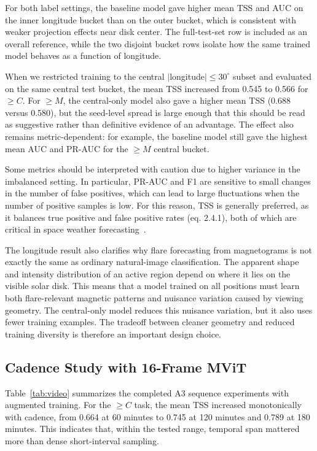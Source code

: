 For both label settings, the baseline model gave higher mean TSS and AUC on the inner longitude bucket than on the outer bucket, which is consistent with weaker projection effects near disk center. The full-test-set row is included as an overall reference, while the two disjoint bucket rows isolate how the same trained model behaves as a function of longitude.

When we restricted training to the central $|$longitude$| \leq 30^\circ$ subset and evaluated on the same central test bucket, the mean TSS increased from 0.545 to 0.566 for $\geq C$. For $\geq M$, the central-only model also gave a higher mean TSS (0.688 versus 0.580), but the seed-level spread is large enough that this should be read as suggestive rather than definitive evidence of an advantage. The effect also remains metric-dependent: for example, the baseline model still gave the highest mean AUC and PR-AUC for the $\geq M$ central bucket.

Some metrics should be interpreted with caution due to higher variance in the imbalanced setting. In particular, PR-AUC and F1 are sensitive to small changes in the number of false positives, which can lead to large fluctuations when the number of positive samples is low. For this reason, TSS is generally preferred, as it balances true positive and false positive rates (eq. 2.4.1), both of which are critical in space weather forecasting~\cite{ref_bloomfield}.

The longitude result also clarifies why flare forecasting from magnetograms is not exactly the same as ordinary natural-image classification. The apparent shape and intensity distribution of an active region depend on where it lies on the visible solar disk. This means that a model trained on all positions must learn both flare-relevant magnetic patterns and nuisance variation caused by viewing geometry. The central-only model reduces this nuisance variation, but it also uses fewer training examples. The tradeoff between cleaner geometry and reduced training diversity is therefore an important design choice.

\subsection{Cadence Study with 16-Frame MViT}

Table~\ref{tab:video} summarizes the completed A3 sequence experiments with augmented training. For the $\geq C$ task, the mean TSS increased monotonically with cadence, from 0.664 at 60 minutes to 0.745 at 120 minutes and 0.789 at 180 minutes. This indicates that, within the tested range, temporal span mattered more than dense short-interval sampling.

